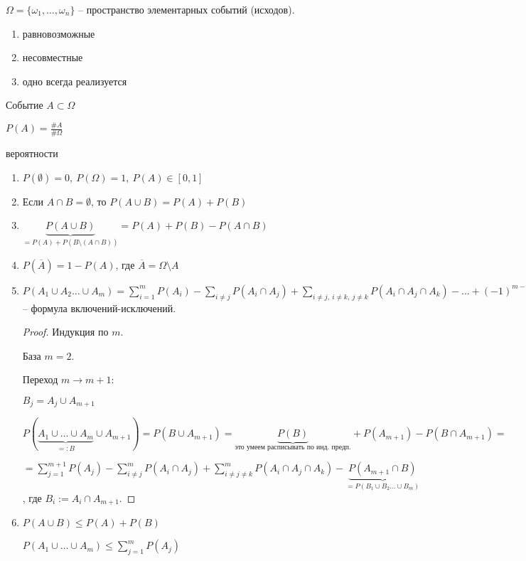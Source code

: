 
\begin{definition}
    $\Omega = \{ \omega_1, \dots, \omega_n \}$ -- пространство элементарных событий (исходов).

    \begin{enumerate}
        \item равновозможные
        \item несовместные
        \item одно всегда реализуется
    \end{enumerate}
\end{definition}

\begin{definition}
    Событие $A \subset \Omega$

    $P(A) = \frac{\#A}{\#\Omega}$
\end{definition}

\begin{properties} вероятности
    \begin{enumerate}
        \item $P(\emptyset) = 0, \ P(\Omega) = 1, \ P(A) \in [0, 1]$
        \item Если $A \cap B = \emptyset$, то $P(A \cup B) = P(A) + P(B)$
        \item $\underbrace{P(A \cup B)}_{= P(A) + P(B \setminus (A \cap B))} = P(A) + P(B) - P(A \cap B)$
        \item $P(\overline{A}) = 1 - P(A)$, где $\overline{A} = \Omega \setminus A$
        \item {
            $P(A_1 \cup A_2 \dots \cup A_m) = \sum_{i = 1}^{m} P(A_i) - \sum_{i \not = j} P(A_i \cap A_j) + \sum_{i \not = j, \ i \not = k, \ j \not = k} P(A_i \cap A_j \cap A_k) - \dots + (-1)^{m-1} \cdot P(A_1 \cap \dots \cap A_m)$ -- формула включений-исключений.

            \begin{proof}
                Индукция по $m$.

                База $m = 2$.

                Переход $m \rightarrow m + 1$:

                $B_j = A_j \cup A_{m + 1}$

                $P(\underbrace{A_1 \cup \dots \cup A_m}_{=: B} \cup A_{m + 1}) = P(B \cup A_{m+1}) = \underbrace{P(B)}_{\text{это умеем расписывать по инд. предп.}} + P(A_{m+1}) - P(B \cap A_{m + 1}) = $

                $= \sum_{j = 1}^{m+1} P(A_j) - \sum_{i \not = j}^{m} P(A_i \cap A_j) + \sum_{i \not = j \not = k}^{m} P(A_i \cap A_j \cap A_k) - \underbrace{P(A_{m + 1} \cap B)}_{= P(B_1 \cup B_2 \dots \cup B_m)}$, где $B_i := A_i \cap A_{m + 1}$.
            \end{proof}
        }
        \item {
            $P(A \cup B) \leq P(A) + P(B)$

            $P(A_1 \cup \dots \cup A_m) \leq \sum_{j = 1}^{m} P(A_j)$
        }
    \end{enumerate}
\end{properties}


